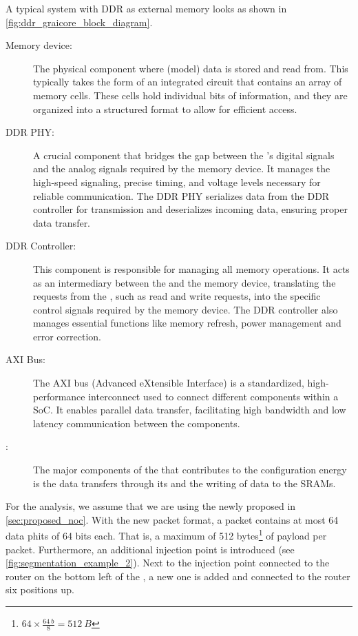 A typical system with DDR as external memory looks as shown in \cref{fig:ddr_graicore_block_diagram}.
\begin{description}
    \item[Memory device:] 
    The physical component where (model) data is stored and read from.
    This typically takes the form of an integrated circuit that contains an array of memory cells.
    These cells hold individual bits of information, and they are organized into a structured format to allow for efficient access.
    \item[DDR PHY:] 
    A crucial component that bridges the gap between the \graicore{}'s digital signals and the analog signals required by the memory device.
    It manages the high-speed signaling, precise timing, and voltage levels necessary for reliable communication.
    The DDR PHY serializes data from the DDR controller for transmission and deserializes incoming data, ensuring proper data transfer.
    \item[DDR Controller:] 
    This component is responsible for managing all memory operations.
    It acts as an intermediary between the \graicore{} and the memory device, translating the requests from the \graicore{}, such as read and write requests, into the specific control signals required by the memory device.
    The DDR controller also manages essential functions like memory refresh, power management and error correction.
    \item[AXI Bus:] 
    The AXI bus (Advanced eXtensible Interface) is a standardized, high-performance interconnect used to connect different components within a SoC.
    It enables parallel data transfer, facilitating high bandwidth and low latency communication between the components.
    \item[\graicore{}:] 
    The major components of the \graicore{} that contributes to the configuration energy is the data transfers through its \confignoc{} and the writing of data to the SRAMs.
\end{description}

For the analysis, we assume that we are using the newly proposed \confignoc{} in \cref{sec:proposed_noc}. 
With the new packet format, a packet contains at most 64 data phits of 64 bits each.
That is, a maximum of 512 bytes\footnote{$64 \times \frac{\SI{64}{b}}{8} = \SI{512}{B}$} of payload per packet.
Furthermore, an additional injection point is introduced (see \cref{fig:segmentation_example_2}).
Next to the injection point connected to the router on the bottom left of the \confignoc{}, a new one is added and connected to the router six positions up.

